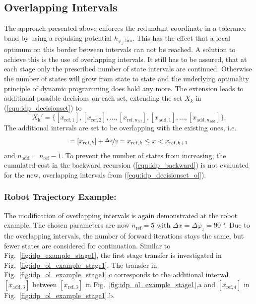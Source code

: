 \documentclass[runningheads]{llncs}
\begin{document}
\subsection{Overlapping Intervals}
\label{sec:overlapping}

The approach presented above enforces the redundant coordinate in a tolerance band by using a repulsing potential $h_{\varphi_{z},\mathrm{lim}}$.
This has the effect that a local optimum on this border between intervals can not be reached.
A solution to achieve this is the use of overlapping intervals.
It still has to be assured, that at each stage only the prescribed number of state intervals are continued.
Otherwise the number of states will grow from state to state and the underlying optimality principle of dynamic programming does hold any more.
The extension leads to additional possible decisions on each set, extending the set $X_k$ in (\ref{equ:idp_decisionset}) to
%
\begin{equation}
X_\mathrm{k}'=
\{
[x_{\mathrm{ref},1}],[x_{\mathrm{ref},2}],...,[x_{\mathrm{ref},n_{\mathrm{ref}}}],
[x_{\mathrm{add},1}],...,[x_{\mathrm{add},n_{\mathrm{add}}}]
\}.
\label{equ:idp_decisionset_ol}
\end{equation}
%
The additional intervals are set to be overlapping with the existing ones, i.e.
%
\begin{equation}
[x_{\mathrm{add},k}]=[x_{\mathrm{ref},k}]+\nicefrac{\Delta x}{2}
= x_{\mathrm{ref},k} \le x <  x_{\mathrm{ref},k+1}
\end{equation}
%
and $n_{\mathrm{add}}=n_{\mathrm{ref}}-1$.
To prevent the number of states from increasing, the cumulated cost in the backward recursion (\ref{equ:idp_backward}) is not evaluated for the new, overlapping intervals from (\ref{equ:idp_decisionset_ol}).

\subsubsection{Robot Trajectory Example:}
The modification of overlapping intervals is again demonstrated at the robot example.
The chosen parameters are now $n_\mathrm{ref}=5$ with $\Delta x = \Delta \varphi_{z} = \SI{90}{\degree}$.
Due to the overlapping intervals, the number of forward iterations stays the same, but fewer states are considered for continuation.
Similar to Fig.~\ref{fig:idp_example_stage1}, the first stage transfer is investigated in Fig.~\ref{fig:idp_ol_example_stage1}.
The transfer in Fig.~\ref{fig:idp_ol_example_stage1},c corresponds to the additional interval $[x_{\mathrm{add},3}]$ between $[x_{\mathrm{ref},3}]$ in Fig.~\ref{fig:idp_ol_example_stage1},a and $[x_{\mathrm{ref},4}]$ in Fig.~\ref{fig:idp_ol_example_stage1},b.
\end{document}
